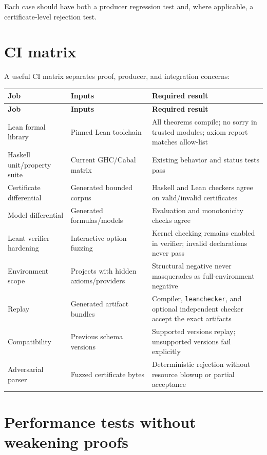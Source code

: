 \documentclass[11pt,letterpaper,openany]{report}
\theoremstyle{definition}
\theoremstyle{remark}
\newcommand{\code}[1]{\texttt{#1}}
\begin{document}
Each case should have both a producer regression test and, where applicable, a certificate-level rejection test.

\section{CI matrix}

A useful CI matrix separates proof, producer, and integration concerns:

\begin{longtable}{L{0.22\textwidth} L{0.32\textwidth} L{0.37\textwidth}}
\toprule
\textbf{Job} & \textbf{Inputs} & \textbf{Required result} \\
\midrule
\endfirsthead
\toprule
\textbf{Job} & \textbf{Inputs} & \textbf{Required result} \\
\midrule
\endhead
Lean formal library & Pinned Lean toolchain & All theorems compile; no sorry in trusted modules; axiom report matches allow-list \\
Haskell unit/property suite & Current GHC/Cabal matrix & Existing behavior and status tests pass \\
Certificate differential & Generated bounded corpus & Haskell and Lean checkers agree on valid/invalid certificates \\
Model differential & Generated formulas/models & Evaluation and monotonicity checks agree \\
Leant verifier hardening & Interactive option fuzzing & Kernel checking remains enabled in verifier; invalid declarations never pass \\
Environment scope & Projects with hidden axioms/providers & Structural negative never masquerades as full-environment negative \\
Replay & Generated artifact bundles & Compiler, \code{leanchecker}, and optional independent checker accept the exact artifacts \\
Compatibility & Previous schema versions & Supported versions replay; unsupported versions fail explicitly \\
Adversarial parser & Fuzzed certificate bytes & Deterministic rejection without resource blowup or partial acceptance \\
\bottomrule
\end{longtable}

\section{Performance tests without weakening proofs}
\end{document}

